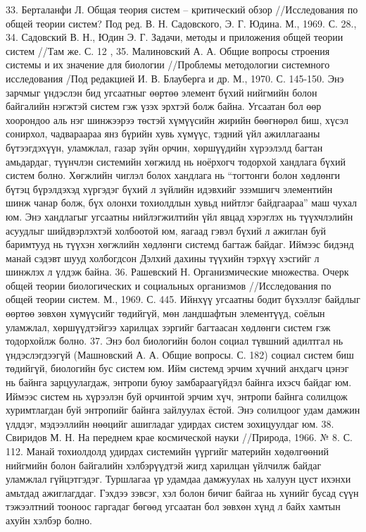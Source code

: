 33. Берталанфи Л. Общая теория систем – критический обзор //Исследования по общей теории систем? Под ред. В. Н. Садовского, Э. Г. Юдина. М., 1969. С. 28., 34. Садовский В. Н., Юдин Э. Г. Задачи, методы и приложения общей теории систем //Там же. С. 12 , 35. Малиновский А. А. Общие вопросы строения системы и их значение для биологии //Проблемы методологии системного исследования /Под редакцией И. В. Блауберга и др. М., 1970. С. 145-150.
Энэ зарчмыг үндэслэн бид угсаатныг өөртөө элемент бүхий нийгмийн болон байгалийн нэгжтэй систем гэж үзэх эрхтэй болж байна. Угсаатан бол өөр хоорондоо аль нэг шинжээрээ төстэй хүмүүсийн жирийн бөөгнөрөл биш, хүсэл сонирхол, чадвараараа янз бүрийн хувь хүмүүс, тэдний үйл ажиллагааны бүтээгдэхүүн, уламжлал, газар зүйн орчин, хөршүүдийн хүрээлэлд багтан амьдардаг, түүнчлэн системийн хөгжилд нь ноёрхогч тодорхой хандлага бүхий систем болно. Хөгжлийн чиглэл болох хандлага нь “тогтонги болон хөдлөнги бүтэц бүрэлдэхэд хүргэдэг бүхий л зүйлийн идэвхийг эзэмшигч элементийн шинж чанар болж, бүх олонхи тохиолдлын хувьд нийтлэг байдгаараа” маш чухал юм. Энэ хандлагыг угсаатны нийлэгжилтийн үйл явцад хэрэглэх нь түүхчлэлийн асуудлыг шийдвэрлэхтэй холбоотой юм, яагаад гэвэл бүхий л ажиглан буй баримтууд нь түүхэн хөгжлийн хөдлөнги системд багтаж байдаг. Иймээс бидэнд манай сэдэвт шууд холбогдсон Дэлхий дахины түүхийн тэрхүү хэсгийг л шинжлэх л үлдэж байна. 36. Рашевский Н. Организмические множества. Очерк общей теории биологических и социальных организмов //Исследования по общей теории систем. М., 1969. С. 445.
Ийнхүү угсаатны бодит бүхэллэг байдлыг өөртөө зөвхөн хүмүүсийг төдийгүй, мөн ландшафтын элементүүд, соёлын уламжлал, хөршүүдтэйгээ харилцах зэргийг багтаасан хөдлөнги систем гэж тодорхойлж болно. 37. Энэ бол биологийн болон социал түвшний адилтгал нь үндэслэгдээгүй (Машновский А. А. Общие вопросы. С. 182) социал систем биш төдийгүй, биологийн бус систем юм.
Ийм системд эрчим хүчний анхдагч цэнэг нь байнга зарцуулагдаж, энтропи буюу замбараагүйдэл байнга ихэсч байдаг юм. Иймээс систем нь хүрээлэн буй орчинтой эрчим хүч, энтропи байнга солилцож хуримтлагдан буй энтропийг байнга зайлуулах ёстой. Энэ солилцоог удам дамжин үлддэг, мэдээллийн нөөцийг ашигладаг удирдах систем зохицуулдаг юм. 38. Свиридов М. Н. На переднем крае космической науки //Природа, 1966. № 8. С. 112.
Манай тохиолдолд удирдах системийн үүргийг материйн хөдөлгөөний нийгмийн болон байгалийн хэлбэрүүдтэй жигд харилцан үйлчилж байдаг уламжлал гүйцэтгэдэг. Туршлагаа үр удамдаа дамжуулах нь халуун цуст ихэнхи амьтдад ажиглагддаг. Гэхдээ зэвсэг, хэл болон бичиг байгаа нь хүнийг бусад сүүн тэжээлтний тооноос гаргадаг бөгөөд угсаатан бол зөвхөн хүнд л байх хамтын ахуйн хэлбэр болно.
